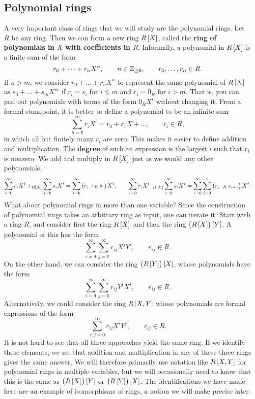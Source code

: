 \subsection{Polynomial rings}


A very important class of rings that we will study are the polynomial rings. Let $ R $ be any ring. Then we can form a new ring $ R\sbr{X} $, called the \textbf{ring of polynomials in $ X $ with coefficients in $ R $}. Informally, a polynomial in $ R\sbr{X} $ is a finite sum of the form
$$ r_0 + \dots + r_nX^n, \qquad n \in \mathbb{Z}_{\ge 0}, \qquad r_0, \dots, r_n \in R. $$
If $ n > m $, we consider $ r_0 + \dots + r_nX^n $ to represent the same polynomial of $ R\sbr{X} $ as $ s_0 + \dots + s_mX^m $ if $ r_i = s_i $ for $ i \le m $ and $ r_i = 0_R $ for $ i > m $. That is, you can pad out polynomials with terms of the form $ 0_RX^i $ without changing it. From a formal standpoint, it is better to define a polynomial to be an infinite sum
$$ \sum_{n = 0}^\infty r_iX^i = r_0 + r_1X + \dots, \qquad r_i \in R, $$
in which all but finitely many $ r_i $ are zero. This makes it easier to define addition and multiplication. The \textbf{degree} of such an expression is the largest $ i $ such that $ r_i $ is nonzero. We add and multiply in $ R\sbr{X} $ just as we would any other polynomials,
$$ \sum_{i = 0}^\infty r_iX^i +_{R\sbr{X}} \sum_{i = 0}^\infty s_iX^i = \sum_{i = 0}^\infty \br{r_i +_R s_i} X^i, \qquad \sum_{i = 0}^\infty r_iX^i \cdot_{R\sbr{X}} \sum_{i = 0}^\infty s_iX^i = \sum_{i = 0}^\infty \sum_{j = 0}^i \br{r_j \cdot_R s_{i - j}} X^i. $$
What about polynomial rings in more than one variable? Since the construction of polynomial rings takes an arbitrary ring as input, one can iterate it. Start with a ring $ R $, and consider first the ring $ R\sbr{X} $ and then the ring $ \br{R\sbr{X}}\sbr{Y} $. A polynomial of this has the form
$$ \sum_{i = 0}^\infty \sum_{j = 0}^\infty r_{ij}X^jY^i, \qquad r_{ij} \in R. $$
On the other hand, we can consider the ring $ \br{R\sbr{Y}}\sbr{X} $, whose polynomials have the form
$$ \sum_{i = 0}^\infty \sum_{j = 0}^\infty r_{ij}Y^jX^i, \qquad r_{ij} \in R. $$
Alternatively, we could consider the ring $ R\sbr{X, Y} $ whose polynomials are formal expressions of the form
$$ \sum_{i, j = 0}^\infty r_{ij}X^iY^j, \qquad r_{ij} \in R. $$
It is not hard to see that all three approaches yield the same ring. If we identify these elements, we see that addition and multiplication in any of these three rings gives the same answer. We will therefore primarily use notation like $ R\sbr{X, Y} $ for polynomial rings in multiple variables, but we will occasionally need to know that this is the same as $ \br{R\sbr{X}}\sbr{Y} $ or $ \br{R\sbr{Y}}\sbr{X} $. The identifications we have made here are an example of isomorphisms of rings, a notion we will make precise later.

